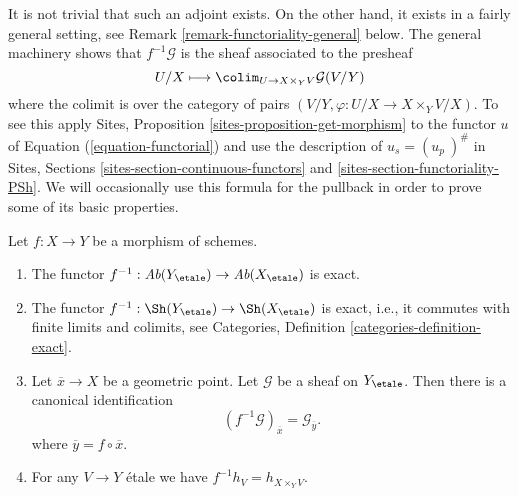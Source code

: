 \noindent
It is not trivial that such an adjoint exists.
On the other hand, it exists in a fairly general setting, see
Remark \ref{remark-functoriality-general}
below. The general machinery shows that $f^{-1}\mathcal{G}$
is the sheaf associated to the presheaf
\begin{equation}
\label{equation-pullback}
U/X
\longmapsto
\colim_{U \to X \times_Y V} \mathcal{G}(V/Y)
\end{equation}
where the colimit is over the category of pairs
$(V/Y, \varphi : U/X \to X \times_Y V/X)$.
To see this apply
Sites, Proposition \ref{sites-proposition-get-morphism}
to the functor $u$ of Equation (\ref{equation-functorial})
and use the description of $u_s = (u_p\ )^\#$ in
Sites, Sections \ref{sites-section-continuous-functors} and
\ref{sites-section-functoriality-PSh}.
We will occasionally use this formula for the pullback
in order to prove some of its basic properties.

\begin{lemma}
\label{lemma-stalk-pullback}
Let $f : X \to Y$ be a morphism of schemes.
\begin{enumerate}
\item The functor
$f^{-1} : \textit{Ab}(Y_\etale) \to \textit{Ab}(X_\etale)$
is exact.
\item The functor
$f^{-1} : \Sh(Y_\etale) \to \Sh(X_\etale)$
is exact, i.e., it commutes with finite limits and colimits, see
Categories, Definition \ref{categories-definition-exact}.
\item Let $\overline{x} \to X$ be a geometric point.
Let $\mathcal{G}$ be a sheaf on $Y_\etale$.
Then there is a canonical identification
$$
(f^{-1}\mathcal{G})_{\overline{x}} = \mathcal{G}_{\overline{y}}.
$$
where $\overline{y} = f \circ \overline{x}$.
\item For any $V \to Y$ \'etale we have $f^{-1}h_V = h_{X \times_Y V}$.
\end{enumerate}
\end{lemma}

